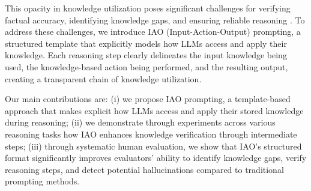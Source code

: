 This opacity in knowledge utilization poses significant challenges for verifying factual accuracy, identifying knowledge gaps, and ensuring reliable reasoning \cite{chen2024survey}. To address these challenges, we introduce IAO (Input-Action-Output) prompting, a structured template that explicitly models how LLMs access and apply their knowledge. Each reasoning step clearly delineates the input knowledge being used, the knowledge-based action being performed, and the resulting output, creating a transparent chain of knowledge utilization.

Our main contributions are:
(i) we propose IAO prompting, a template-based approach that makes explicit how LLMs access and apply their stored knowledge during reasoning;
(ii) we demonstrate through experiments across various reasoning tasks how IAO enhances knowledge verification through intermediate steps; (iii) through systematic human evaluation, we show that IAO's structured format significantly improves evaluators' ability to identify knowledge gaps, verify reasoning steps, and detect potential hallucinations compared to traditional prompting methods.

